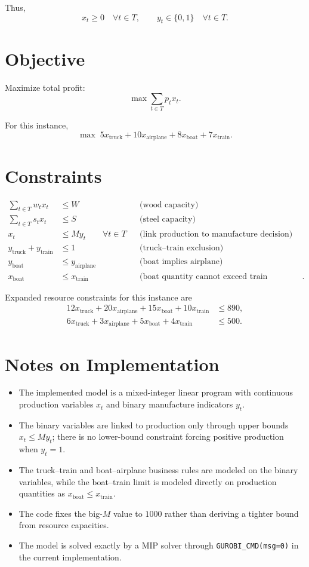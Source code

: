 Thus,
\[
x_t \ge 0 \quad \forall t\in T,
\qquad
y_t \in \{0,1\} \quad \forall t\in T.
\]

\section*{Objective}

Maximize total profit:
\[
\max \sum_{t\in T} p_t x_t.
\]

For this instance,
\[
\max \; 5x_{\text{truck}} + 10x_{\text{airplane}} + 8x_{\text{boat}} + 7x_{\text{train}}.
\]

\section*{Constraints}

\begin{align}
\sum_{t\in T} w_t x_t &\le W
&& \text{(wood capacity)} \\
\sum_{t\in T} s_t x_t &\le S
&& \text{(steel capacity)} \\
x_t &\le M y_t \qquad \forall t\in T
&& \text{(link production to manufacture decision)} \\
y_{\text{truck}} + y_{\text{train}} &\le 1
&& \text{(truck--train exclusion)} \\
y_{\text{boat}} &\le y_{\text{airplane}}
&& \text{(boat implies airplane)} \\
x_{\text{boat}} &\le x_{\text{train}}
&& \text{(boat quantity cannot exceed train quantity)}.
\end{align}

Expanded resource constraints for this instance are
\begin{align}
12x_{\text{truck}} + 20x_{\text{airplane}} + 15x_{\text{boat}} + 10x_{\text{train}} &\le 890, \\
6x_{\text{truck}} + 3x_{\text{airplane}} + 5x_{\text{boat}} + 4x_{\text{train}} &\le 500.
\end{align}

\section*{Notes on Implementation}

\begin{itemize}
    \item The implemented model is a mixed-integer linear program with continuous production variables $x_t$ and binary manufacture indicators $y_t$.
    \item The binary variables are linked to production only through upper bounds $x_t \le M y_t$; there is no lower-bound constraint forcing positive production when $y_t=1$.
    \item The truck--train and boat--airplane business rules are modeled on the binary variables, while the boat--train limit is modeled directly on production quantities as $x_{\text{boat}} \le x_{\text{train}}$.
    \item The code fixes the big-$M$ value to $1000$ rather than deriving a tighter bound from resource capacities.
    \item The model is solved exactly by a MIP solver through \texttt{GUROBI\_CMD(msg=0)} in the current implementation.
\end{itemize}
